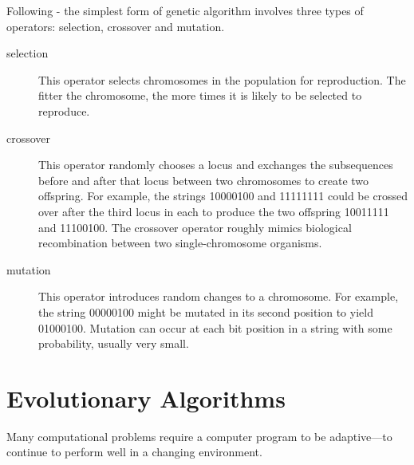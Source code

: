 Following \cite{Mitchell01} - the simplest form of genetic algorithm involves three types of operators: selection, crossover and mutation. 

\begin{description}

\item[selection]
  This operator selects chromosomes in the population for reproduction.
  The fitter the chromosome, the more times it is likely to be selected to reproduce.
  
\item[crossover]
  This operator randomly chooses a locus and exchanges the subsequences before and after that locus between two chromosomes to create two offspring.
  For example, the strings 10000100 and 11111111 could be crossed over after the third locus in each to produce the two offspring 10011111 and 11100100.
  The crossover operator roughly mimics biological recombination between two single-chromosome organisms.

\item[mutation]
  This operator introduces random changes to a chromosome.
  For example, the string 00000100 might be mutated in its second position to yield 01000100.
  Mutation can occur at each bit position in a string with some probability, usually very small.


\end{description}


\section{Evolutionary Algorithms}
\label{sec:evolAlgorithms}

Many computational problems require a computer program to be adaptive—to continue to perform well in a
changing environment.

